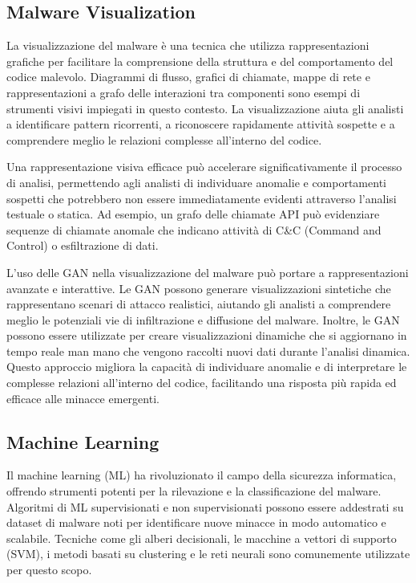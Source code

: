 \subsection{Malware Visualization}

La visualizzazione del malware è una tecnica che utilizza rappresentazioni grafiche per facilitare la comprensione della struttura e del comportamento del codice malevolo. Diagrammi di flusso, grafici di chiamate, mappe di rete e rappresentazioni a grafo delle interazioni tra componenti sono esempi di strumenti visivi impiegati in questo contesto. La visualizzazione aiuta gli analisti a identificare pattern ricorrenti, a riconoscere rapidamente attività sospette e a comprendere meglio le relazioni complesse all'interno del codice.

Una rappresentazione visiva efficace può accelerare significativamente il processo di analisi, permettendo agli analisti di individuare anomalie e comportamenti sospetti che potrebbero non essere immediatamente evidenti attraverso l'analisi testuale o statica. Ad esempio, un grafo delle chiamate API può evidenziare sequenze di chiamate anomale che indicano attività di C\&C (Command and Control) o esfiltrazione di dati.

L'uso delle GAN nella visualizzazione del malware può portare a rappresentazioni avanzate e interattive. Le GAN possono generare visualizzazioni sintetiche che rappresentano scenari di attacco realistici, aiutando gli analisti a comprendere meglio le potenziali vie di infiltrazione e diffusione del malware. Inoltre, le GAN possono essere utilizzate per creare visualizzazioni dinamiche che si aggiornano in tempo reale man mano che vengono raccolti nuovi dati durante l'analisi dinamica. Questo approccio migliora la capacità di individuare anomalie e di interpretare le complesse relazioni all'interno del codice, facilitando una risposta più rapida ed efficace alle minacce emergenti.


\subsection{Machine Learning}

Il machine learning (ML) ha rivoluzionato il campo della sicurezza informatica, offrendo strumenti potenti per la rilevazione e la classificazione del malware. Algoritmi di ML supervisionati e non supervisionati possono essere addestrati su dataset di malware noti per identificare nuove minacce in modo automatico e scalabile. Tecniche come gli alberi decisionali, le macchine a vettori di supporto (SVM), i metodi basati su clustering e le reti neurali sono comunemente utilizzate per questo scopo.

